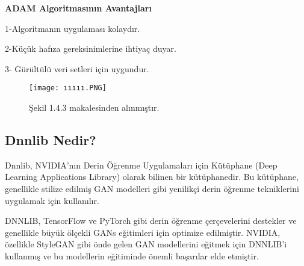 \documentclass[12pt]{article}
\begin{document}
\textbf{ADAM Algoritmasının Avantajları} 

1-Algoritmanın uygulaması kolaydır.

2-Küçük hafıza gereksinimlerine ihtiyaç duyar.

3- Gürültülü veri setleri için uygundur.\cite{medium2023optimizasyon}\newpage
\begin{figure}[h]
  \centering
  \texttt{[image: ııııı.PNG]}
  \caption{Şekil 1.4.3 \cite{seyyarer2020derin} makalesinden alınmıştır.}
  \label{fig:resim_etiketi}
\end{figure}


\subsection{Dnnlib Nedir?}
Dnnlib, NVIDIA'nın Derin Öğrenme Uygulamaları için Kütüphane (Deep Learning Applications Library) olarak bilinen bir kütüphanedir. Bu kütüphane, genellikle stilize edilmiş GAN modelleri gibi yenilikçi derin öğrenme tekniklerini uygulamak için kullanılır.

DNNLIB, TensorFlow ve PyTorch gibi derin öğrenme çerçevelerini destekler ve genellikle büyük ölçekli GANs eğitimleri için optimize edilmiştir. NVIDIA, özellikle StyleGAN gibi önde gelen GAN modellerini eğitmek için DNNLIB'i kullanmış ve bu modellerin eğitiminde önemli başarılar elde etmiştir.
\end{document}
